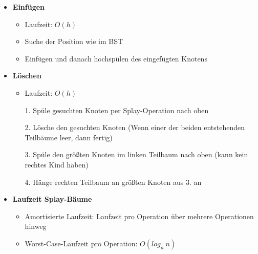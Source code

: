 \begin{itemize}
        \item \textbf{Einfügen}
            \begin{itemize}
                \item Laufzeit: $O(h)$
                \item Suche der Position wie im BST
                \item Einfügen und danach hochspülen des eingefügten Knotens
            \end{itemize}    

        \item \textbf{Löschen}
            \begin{itemize}
                \item Laufzeit: $O(h)$
                \item[1.] Spüle gesuchten Knoten per Splay-Operation nach oben
                \item[2.] Lösche den gesuchten Knoten (Wenn einer der beiden entstehenden Teilbäume leer, dann fertig)
                \item[3.] Spüle den größten Knoten im linken Teilbaum nach oben (kann kein rechtes Kind haben)
                \item[4.] Hänge rechten Teilbaum an größten Knoten aus 3. an   
            \end{itemize}
        
        \item \textbf{Laufzeit Splay-Bäume}
            \begin{itemize}
                \item Amortisierte Laufzeit: Laufzeit pro Operation über mehrere Operationen hinweg
                \item Worst-Case-Laufzeit pro Operation: $O(log_n~n)$
            \end{itemize}
    \end{itemize}

